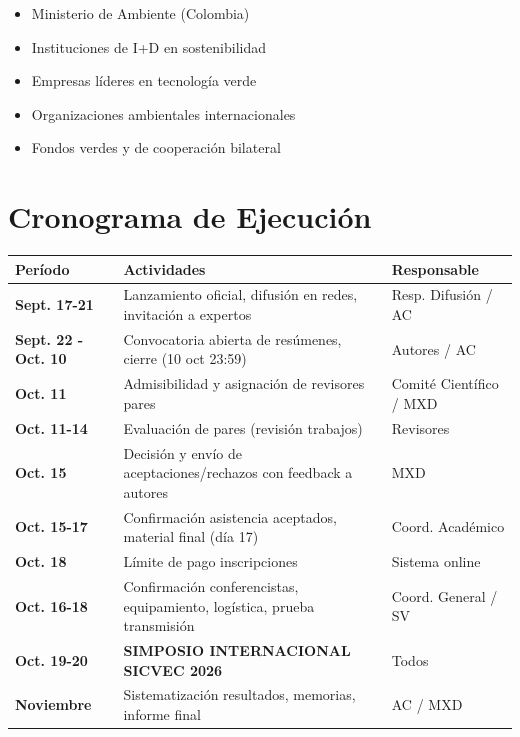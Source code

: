 \documentclass[12pt,a4paper]{article}
\begin{document}
\begin{itemize}[label={\textcolor{verdeosc}{\textbullet}}]
  \item Ministerio de Ambiente (Colombia)
  \item Instituciones de I+D en sostenibilidad
  \item Empresas líderes en tecnología verde
  \item Organizaciones ambientales internacionales
  \item Fondos verdes y de cooperación bilateral
\end{itemize}

\newpage

\section{Cronograma de Ejecución}

\begin{table}[H]
\centering
\small
\begin{tabular}{|l|p{7.5cm}|l|}
\hline
\rowcolor{verdeclaro}
\textbf{Período} & \textbf{Actividades} & \textbf{Responsable} \\
\hline
\textbf{Sept. 17-21} & Lanzamiento oficial, difusión en redes, invitación a expertos & Resp. Difusión / AC \\
\hline
\textbf{Sept. 22 - Oct. 10} & Convocatoria abierta de resúmenes, cierre (10 oct 23:59) & Autores / AC \\
\hline
\textbf{Oct. 11} & Admisibilidad y asignación de revisores pares & Comité Científico / MXD \\
\hline
\textbf{Oct. 11-14} & Evaluación de pares (revisión trabajos) & Revisores \\
\hline
\textbf{Oct. 15} & Decisión y envío de aceptaciones/rechazos con feedback a autores & MXD \\
\hline
\textbf{Oct. 15-17} & Confirmación asistencia aceptados, material final (día 17) & Coord. Académico \\
\hline
\textbf{Oct. 18} & Límite de pago inscripciones & Sistema online \\
\hline
\textbf{Oct. 16-18} & Confirmación conferencistas, equipamiento, logística, prueba transmisión & Coord. General / SV \\
\hline
\textbf{Oct. 19-20} & \textbf{SIMPOSIO INTERNACIONAL SICVEC 2026} & Todos \\
\hline
\textbf{Noviembre} & Sistematización resultados, memorias, informe final & AC / MXD \\
\hline
\end{tabular}
\end{table}
\end{document}
